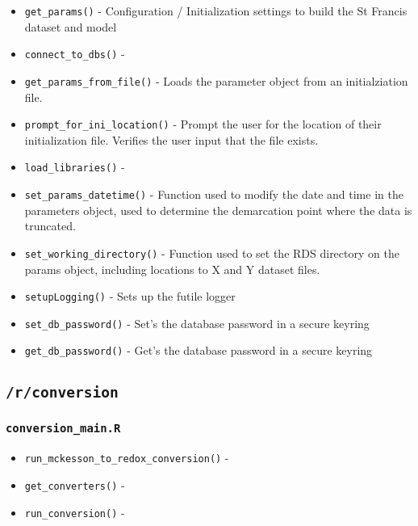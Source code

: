\documentclass[
]{book}
\providecommand{\tightlist}{%
  \setlength{\itemsep}{0pt}\setlength{\parskip}{0pt}}
\begin{document}
\begin{itemize}
\tightlist
\item
  \texttt{get\_params()} - Configuration / Initialization settings to build the St Francis dataset and model
\item
  \texttt{connect\_to\_dbs()} -
\item
  \texttt{get\_params\_from\_file()} - Loads the parameter object from an initialziation file.
\item
  \texttt{prompt\_for\_ini\_location()} - Prompt the user for the location of their initialization file. Verifies the user input that the file exists.
\item
  \texttt{load\_libraries()} -
\item
  \texttt{set\_params\_datetime()} - Function used to modify the date and time in the parameters object, used to determine the demarcation point where the data is truncated.
\item
  \texttt{set\_working\_directory()} - Function used to set the RDS directory on the params object, including locations to X and Y dataset files.
\item
  \texttt{setupLogging()} - Sets up the futile logger
\item
  \texttt{set\_db\_password()} - Set's the database password in a secure keyring
\item
  \texttt{get\_db\_password()} - Get's the database password in a secure keyring
\end{itemize}

\hypertarget{rconversion}{%
\subsection{\texorpdfstring{\texttt{/r/conversion}}{/r/conversion}}\label{rconversion}}

\hypertarget{conversion_main.r}{%
\subsubsection{\texorpdfstring{\texttt{conversion\_main.R}}{conversion\_main.R}}\label{conversion_main.r}}

\begin{itemize}
\tightlist
\item
  \texttt{run\_mckesson\_to\_redox\_conversion()} -
\item
  \texttt{get\_converters()} -
\item
  \texttt{run\_conversion()} -
\end{itemize}
\end{document}
